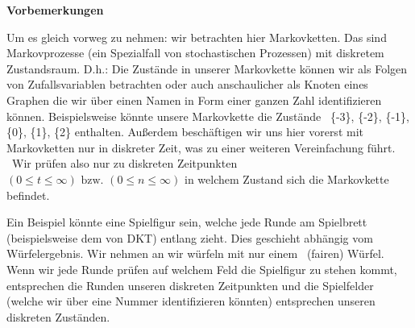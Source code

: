 %
{\bfseries
Vorbemerkungen}


\bigskip

Um es gleich vorweg zu nehmen: wir betrachten hier Markovketten. Das
sind Markovprozesse (ein Spezialfall von stochastischen Prozessen) mit
diskretem Zustandsraum. D.h.: Die Zust\"ande in unserer Markovkette
k\"onnen wir als Folgen von Zufallsvariablen betrachten oder auch
anschaulicher als Knoten eines Graphen die wir \"uber einen Namen in
Form einer ganzen Zahl identifizieren k\"onnen. Beispielsweise k\"onnte
unsere Markovkette die Zust\"ande \ \{-3\}, \{-2\}, \{-1\}, \{0\},
\{1\}, \{2\} enthalten. Au{\ss}erdem besch\"aftigen wir uns hier
vorerst mit Markovketten nur in diskreter Zeit, was zu einer weiteren
Vereinfachung f\"uhrt. \ Wir pr\"ufen also nur zu diskreten Zeitpunkten
 $(0\le t\le \infty )\text{  bzw. }(0\le n\le \infty )$ in welchem
Zustand sich die Markovkette befindet.

\begin{bsp}
Ein Beispiel k\"onnte eine Spielfigur sein, welche jede Runde am
Spielbrett (beispielsweise dem von DKT) entlang zieht. Dies geschieht
abh\"angig vom W\"urfelergebnis. Wir nehmen an wir w\"urfeln mit nur
einem \ (fairen) W\"urfel. Wenn wir jede Runde pr\"ufen auf welchem
Feld die Spielfigur zu stehen kommt, entsprechen die Runden unseren
diskreten Zeitpunkten und die Spielfelder (welche wir \"uber eine
Nummer identifizieren k\"onnten) entsprechen unseren diskreten
Zust\"anden.
\end{bsp}


